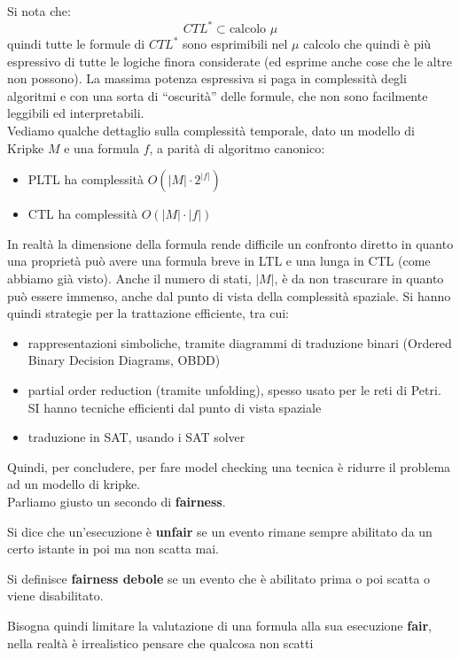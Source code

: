 \documentclass[a4paper,12pt, oneside]{book}
\begin{document}
Si nota che:
\[CTL^*\subset \mbox{calcolo } \mu\]
quindi tutte le formule di $CTL^*$ sono esprimibili nel $\mu$ calcolo che quindi
è più espressivo di tutte le logiche finora considerate (ed esprime anche cose
che le altre non possono). La massima potenza espressiva si paga in complessità
degli algoritmi e con una sorta di ``oscurità'' delle formule, che non sono
facilmente leggibili ed interpretabili.\\
Vediamo qualche dettaglio sulla complessità temporale, dato un modello di
Kripke $M$ e una formula $f$, a parità di algoritmo canonico:
\begin{itemize}
  \item PLTL ha complessità $O(|M|\cdot 2^{|f|})$
  \item CTL ha complessità $O(|M|\cdot |f|)$
\end{itemize}
In realtà la dimensione della formula rende difficile un confronto diretto in
quanto una proprietà può avere una formula breve in LTL e una lunga in CTL (come
abbiamo già visto). Anche il numero di stati, $|M|$, è da non trascurare in
quanto può essere immenso, anche dal punto di vista della complessità
spaziale. Si hanno quindi strategie per la trattazione 
efficiente, tra cui:
\begin{itemize}
  \item rappresentazioni simboliche, tramite diagrammi di traduzione
  binari (Ordered Binary Decision Diagrams, OBDD)
  \item partial order reduction (tramite unfolding), spesso usato per le
  reti di Petri. SI hanno tecniche efficienti dal punto di vista spaziale
  \item traduzione in SAT, usando i SAT solver
\end{itemize}
Quindi, per concludere, per fare model checking una tecnica è ridurre il
problema ad un modello di kripke.\\
Parliamo giusto un secondo di \textbf{fairness}.
\begin{definizione}
  Si dice che un'esecuzione è \textbf{unfair} se un evento rimane sempre
  abilitato da un certo istante in poi ma non scatta mai.\\
\end{definizione}
\begin{definizione}
  Si definisce \textbf{fairness debole} se un evento che è abilitato
  prima o poi scatta o viene disabilitato.
\end{definizione}
Bisogna quindi limitare la valutazione di una formula alla sua esecuzione
\textbf{fair}, nella realtà è irrealistico pensare che qualcosa non scatti
\end{document}
